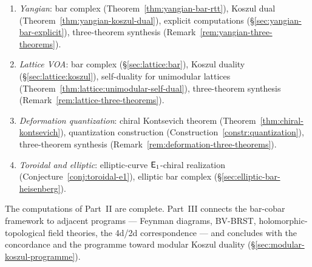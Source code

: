 \begin{remark}
\begin{enumerate}
  Koszul duality (Theorem~\ref{thm:w-algebra-koszul-main}),
  genus-$1$ pipeline (\S\ref{sec:w3-genus-one-pipeline}),
  general $\kappa$ formula (Theorem~\ref{thm:wn-obstruction}),
  three-theorem synthesis
  (Remark~\ref{rem:w-algebra-three-theorems}).
\item \emph{Yangian}:
  bar complex (Theorem~\ref{thm:yangian-bar-rtt}),
  Koszul dual (Theorem~\ref{thm:yangian-koszul-dual}),
  explicit computations (\S\ref{sec:yangian-bar-explicit}),
  three-theorem synthesis
  (Remark~\ref{rem:yangian-three-theorems}).
\item \emph{Lattice VOA}:
  bar complex (\S\ref{sec:lattice:bar}),
  Koszul duality (\S\ref{sec:lattice:koszul}),
  self-duality for unimodular lattices
  (Theorem~\ref{thm:lattice:unimodular-self-dual}),
  three-theorem synthesis
  (Remark~\ref{rem:lattice-three-theorems}).
\item \emph{Deformation quantization}:
  chiral Kontsevich theorem
  (Theorem~\ref{thm:chiral-kontsevich}),
  quantization construction
  (Construction~\ref{constr:quantization}),
  three-theorem synthesis
  (Remark~\ref{rem:deformation-three-theorems}).
\item \emph{Toroidal and elliptic}:
  elliptic-curve $\mathsf{E}_1$-chiral realization
  (Conjecture~\ref{conj:toroidal-e1}),
  elliptic bar complex
  (\S\ref{sec:elliptic-bar-heisenberg}).
\end{enumerate}
\end{remark}

\medskip

\noindent
The computations of Part~II are complete.  Part~III connects the bar-cobar framework to adjacent programs --- Feynman diagrams, BV-BRST, holomorphic-topological field theories, the 4d/2d correspondence --- and concludes with the concordance and the programme toward modular Koszul duality (\S\ref{sec:modular-koszul-programme}).
